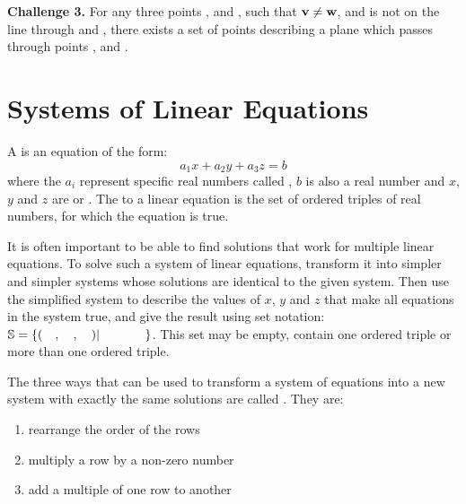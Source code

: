  \noindent \textbf{Challenge 3.} 
    For any three points ,  and , such that $\mathbf{v} \neq \mathbf{w}$, and  is not on the line through  and , there exists a set of points describing a plane which passes through points ,  and .
    
\section{Systems of Linear Equations}      \label{Systems of Linear Equations}     
    
\begin{defn}
	A  is an equation of the form: \[a_1 x + a_2 y + a_3 z=b\]  where the $a_i$ represent specific real numbers called , $b$ is also a real number and $x$, $y$ and $z$ are  or . The  to a linear equation is the set of ordered triples of real numbers,  for which the equation is true. 
\end{defn}
 
It is often important to be able to find solutions that work for multiple linear equations. To solve such a system of linear equations, transform it into simpler and simpler systems whose solutions are identical to the given system. Then use the simplified system to describe the values of $x$, $y$ and $z$ that make all equations in the system true, and give the result using set notation: $\mathbb{S}= \{({\quad   },{\quad },{\quad }) | \hspace{.5in} \}$. This set may be empty, contain one ordered triple or more than one ordered triple. 
\newpage
\begin{defn}
The three ways that can be used to transform a system of equations into a new system with exactly the same solutions are called . They are:
\begin{enumerate}
\item rearrange the order of the rows
\item multiply a row by a non-zero number
\item add a multiple of one row to another
\end{enumerate}
\end{defn}
 
